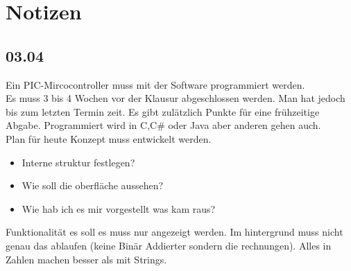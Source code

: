 \section{Notizen}

\subsection{03.04}
Ein PIC-Mircocontroller muss mit der Software programmiert werden. \\ 
Es muss 3 bis 4 Wochen vor der Klausur abgeschlossen werden. Man hat jedoch bis zum letzten Termin zeit. Es gibt zulätzlich Punkte für eine frühzeitige Abgabe.
Programmiert wird in C,C\# oder Java aber anderen gehen auch.\\

Plan für heute Konzept muss entwickelt werden.\\
\begin{itemize}
    \item Interne struktur festlegen?
    \item Wie soll die oberfläche aussehen?
    \item Wie hab ich es mir vorgestellt was kam raus?
\end{itemize}

Funktionalität es soll es muss nur angezeigt werden. Im hintergrund muss nicht genau das ablaufen (keine Binär Addierter sondern die rechnungen).
Alles in Zahlen machen besser als mit Strings.